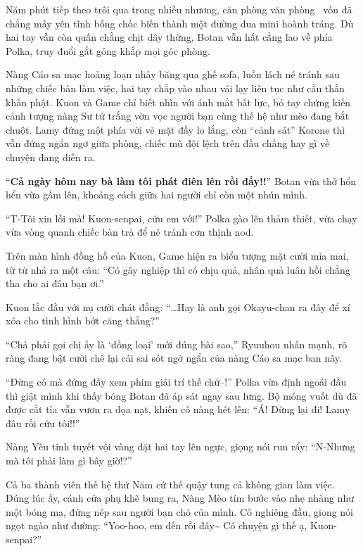 \documentclass[../main.tex]{subfiles}
\begin{document}
\omk

Năm phút tiếp theo trôi qua trong nhiễu nhương, căn phòng văn phòng \hll\ vốn đã chẳng mấy yên tĩnh bỗng chốc biến thành một đường đua mini hoành tráng. Dù hai tay vẫn còn quấn chằng chịt dây thừng, Botan vẫn hất cẳng lao về phía Polka, truy đuổi gắt gỏng khắp mọi góc phòng.

Nàng Cáo sa mạc hoảng loạn nhảy băng qua ghế sofa, luồn lách né tránh sau những chiếc bàn làm việc, hai tay chắp vào nhau vái lạy liên tục như cầu thần khấn phật. Kuon và Game chỉ biết nhìn với ánh mắt bất lực, bó tay chứng kiến cảnh tượng nàng Sư tử trắng vờn vọc người bạn cùng thế hệ như mèo đang bắt chuột. Lamy đứng một phía với vẻ mặt đầy lo lắng, còn ``cảnh sát'' Korone thì vẫn đứng ngẩn ngơ giữa phòng, chiếc mũ đội lệch trên đầu chẳng hay gì về chuyện đang diễn ra.

``\textbf{Cả ngày hôm nay bà làm tôi phát điên lên rồi đấy!!}'' Botan vừa thở hổn hển vừa gầm lên, khoảng cách giữa hai người chỉ còn một nhún mình.

``T-Tôi xin lỗi mà! Kuon-senpai, cứu em với!'' Polka gào lên thảm thiết, vừa chạy vừa vòng quanh chiếc bàn trà để né tránh cơn thịnh nod.

Trên màn hình đồng hồ của Kuon, Game hiện ra biểu tượng mặt cười mỉa mai, từ từ nhả ra một câu: ``Có gây nghiệp thì có chịu quả, nhân quả luân hồi chẳng tha cho ai đâu bạn ơi.''

Kuon lắc đầu với nụ cười chát đắng: ``\dots Hay là anh gọi Okayu-chan ra đây để xí xóa cho tình hình bớt căng thẳng?''

``Chả phải gọi chị ấy là `đồng loại' mới đúng bài sao,'' Ryuuhou nhấn mạnh, rõ ràng đang bật cười chê lại cái sai sót ngớ ngẩn của nàng Cáo sa mạc ban nãy.

``Đừng có mà đứng đấy xem phim giải trí thế chứ--!'' Polka vừa định ngoái đầu thì giật mình khi thấy bóng Botan đã áp sát ngay sau lưng. Bộ móng vuốt dù đã được cắt tỉa vẫn vươn ra dọa nạt, khiến cô nàng hét lên: ``Á! Dừng lại đi! Lamy đâu rồi cứu tôi!!''

Nàng Yêu tinh tuyết vội vàng đặt hai tay lên ngực, giọng nói run rẩy: ``N-Nhưng mà tôi phải làm gì bây giờ!?''

Cả ba thành viên thế hệ thứ Năm cứ thế quậy tung cả không gian làm việc. Đúng lúc ấy, cánh cửa phụ khẽ bung ra, Nàng Mèo tím bước vào nhẹ nhàng như một bóng ma, đứng nép sau người bạn chó của mình. Cô nghiêng đầu, giọng nói ngọt ngào như đường: ``Yoo-hoo, em đến rồi đây\~{} Có chuyện gì thế ạ, Kuon-senpai?''
\end{document}
